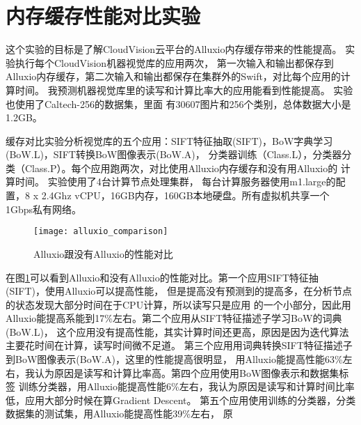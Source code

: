 \section{内存缓存性能对比实验}
\label{sec:memory-cache-experiment}
这个实验的目标是了解CloudVision云平台的Alluxio内存缓存带来的性能提高。
实验执行每个CloudVision机器视觉库的应用两次，
第一次输入和输出都保存到Alluxio内存缓存，第二次输入和输出都保存在集群外的Swift，对比每个应用的计算时间。
我预测机器视觉库里的读写和计算比率大的应用能看到性能提高。
实验也使用了Caltech-256的数据集，里面
有30607图片和256个类别，总体数据大小是1.2GB。

缓存对比实验分析视觉库的五个应用：SIFT特征抽取(SIFT)，BoW字典学习(BoW.L)，SIFT转换BoW图像表示(BoW.A)，
分类器训练（Class.L），分类器分类（Class.P）。每个应用跑两次，对比使用Alluxio内存缓存和没有用Alluxio的
计算时间。
实验使用了4台计算节点处理集群，
每台计算服务器使用m1.large的配置，8 x 2.4Ghz vCPU，16GB内存，160GB本地硬盘。所有虚拟机共享一个
1Gbps私有网络。

\begin{figure}[h]
  \centering
    \texttt{[image: alluxio\_comparison]}
  \caption{Alluxio跟没有Alluxio的性能对比}
  \label{fig:alluxio-comparison}
\end{figure}

在图\ref{fig:alluxio-comparison}可以看到Alluxio和没有Alluxio的性能对比。第一个应用SIFT特征抽(SIFT)，使用Alluxio可以提高性能，
但是提高没有预测到的提高多，在分析节点的状态发现大部分时间在于CPU计算，所以读写只是应用
的一个小部分，因此用Alluxio能提高系能到17\%左右。第二个应用从SIFT特征描述子学习BoW的词典(BoW.L)，
这个应用没有提高性能，其实计算时间还更高，原因是因为迭代算法主要花时间在计算，读写时间微不足道。
第三个应用用词典转换SIFT特征描述子到BoW图像表示(BoW.A)，这里的性能提高很明显，
用Alluxio能提高性能63\%左右，我认为原因是读写和计算比率高。第四个应用使用BoW图像表示和数据集标签
训练分类器，用Alluxio能提高性能6\%左右，我认为原因是读写和计算时间比率低，应用大部分时候在算Gradient Descent。
第五个应用使用训练的分类器，分类数据集的测试集，用Alluxio能提高性能39\%左右，
原
